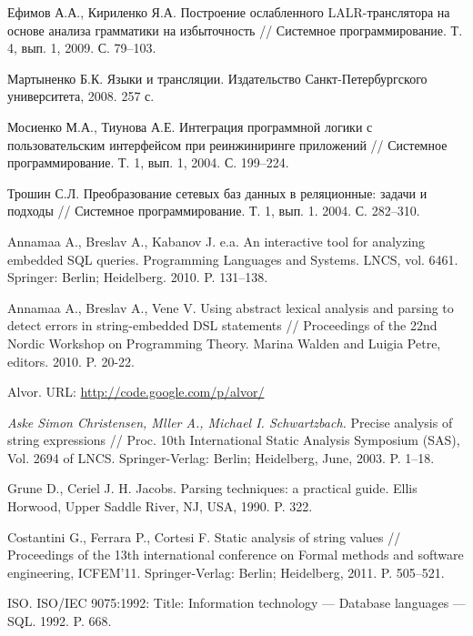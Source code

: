 \documentclass{llncs}
\begin{document}
%
%
\begin{thebibliography}{}
  
Ефимов А.А., Кириленко Я.А. Построение ослабленного LALR-транслятора на основе анализа грамматики на избыточность // Системное программирование. Т. 4, вып. 1, 2009. С. 79–103.  

Мартыненко Б.К. Языки и трансляции. Издательство Санкт-Петербургского университета, 2008. 257 с. 

Мосиенко М.А., Тиунова А.Е. Интеграция программной логики с пользовательским интерфейсом при реинжиниринге приложений // Системное программирование. Т. 1, вып. 1, 2004. С. 199–224.

Трошин С.Л. Преобразование сетевых баз данных в реляционные: задачи и подходы // Системное программирование. Т. 1, вып. 1. 2004. С. 282–310.

Annamaa A., Breslav A., Kabanov J. e.a. An interactive tool for analyzing embedded SQL queries. Programming Languages and Systems. LNCS, vol. 6461. Springer: Berlin; Heidelberg. 2010. P. 131–138.

Annamaa A., Breslav A., Vene V. Using abstract lexical analysis and parsing to detect errors in string-embedded DSL statements // Proceedings of the 22nd Nordic Workshop on Programming Theory. Marina Walden and Luigia Petre, editors. 2010. P. 20-22.

Alvor. URL:  \href{http://code.google.com/p/alvor/}{http://code.google.com/p/alvor/}

\emph{Aske Simon Christensen, Mller A., Michael I. Schwartzbach.} Precise analysis of string expressions // Proc. 10th International Static Analysis Symposium (SAS), Vol. 2694 of LNCS. Springer-Verlag: Berlin; Heidelberg, June, 2003. P. 1–18.

Grune D., Ceriel J. H. Jacobs. Parsing techniques: a practical guide. Ellis Horwood, Upper Saddle River, NJ, USA, 1990. P. 322.

Costantini G., Ferrara P., Cortesi F. Static analysis of string values // Proceedings of the 13th international conference on Formal methods and software engineering, ICFEM’11. Springer-Verlag: Berlin; Heidelberg, 2011. P. 505–521.

ISO. ISO/IEC 9075:1992: Title: Information technology — Database languages — SQL. 1992. P. 668.


\end{thebibliography}
\end{document}
